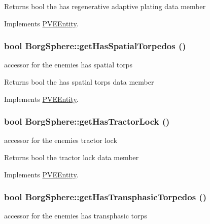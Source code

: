 \begin{DoxyReturn}{Returns}
bool the has regenerative adaptive plating data member 
\end{DoxyReturn}


Implements \hyperlink{classPVEEntity}{PVEEntity}.

\hypertarget{classBorgSphere_a164d0b9916b378571c2ecf4e2cca604a}{
\subsubsection[{getHasSpatialTorpedos}]{\setlength{\rightskip}{0pt plus 5cm}bool BorgSphere::getHasSpatialTorpedos ()}}
\label{d6/ddd/classBorgSphere_a164d0b9916b378571c2ecf4e2cca604a}
accessor for the enemies has spatial torps

\begin{DoxyReturn}{Returns}
bool the has spatial torps data member 
\end{DoxyReturn}


Implements \hyperlink{classPVEEntity}{PVEEntity}.

\hypertarget{classBorgSphere_aa9ba40319ff0a585222a290e57409891}{
\subsubsection[{getHasTractorLock}]{\setlength{\rightskip}{0pt plus 5cm}bool BorgSphere::getHasTractorLock ()}}
\label{d6/ddd/classBorgSphere_aa9ba40319ff0a585222a290e57409891}
accessor for the enemies tractor lock

\begin{DoxyReturn}{Returns}
bool the tractor lock data member 
\end{DoxyReturn}


Implements \hyperlink{classPVEEntity}{PVEEntity}.

\hypertarget{classBorgSphere_a30ef04ddddf5cea157cd73decad5f1c3}{
\subsubsection[{getHasTransphasicTorpedos}]{\setlength{\rightskip}{0pt plus 5cm}bool BorgSphere::getHasTransphasicTorpedos ()}}
\label{d6/ddd/classBorgSphere_a30ef04ddddf5cea157cd73decad5f1c3}
accessor for the enemies has transphasic torps

